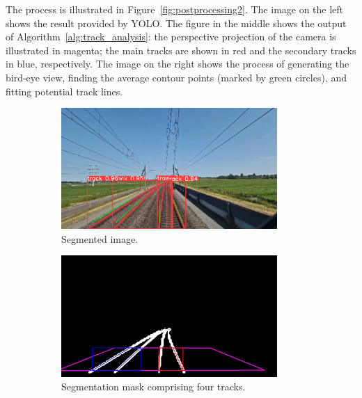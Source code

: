 \documentclass[Master,MDS,english]{BASE/twbook} %
\begin{document}
 The process is illustrated in Figure~\ref{fig:postprocessing2}. The image on the left shows the result provided by YOLO. The figure in the middle shows the output of Algorithm~\ref{alg:track_analysis}: the perspective projection of the camera is illustrated in magenta; the main tracks are shown in red and the secondary tracks in blue, respectively. The image on the right shows the process of generating the bird-eye view, finding the average contour points (marked by green circles), and fitting potential track lines.



\begin{figure}
\centering
\begin{subfigure}[t]{.395\textwidth}
  \centering
  \includegraphics[width=0.9\textwidth]{images/streaming/img3}
  \caption{Segmented image.}
\end{subfigure}%
\begin{subfigure}[t]{.395\textwidth}
  \centering
  \includegraphics[width=0.9\textwidth]{images/streaming/img2}
  \caption{Segmentation mask comprising four tracks.}
\end{subfigure}%
\begin{subfigure}[t]{.215\textwidth}

\end{subfigure}
\end{figure}
\end{document}
